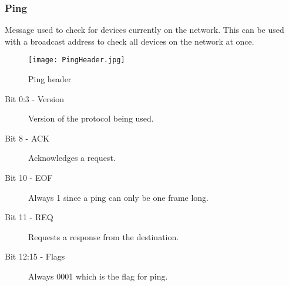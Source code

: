 \subsubsection*{Ping}
Message used to check for devices currently on the network. This can be used with a broadcast address to check all devices on the network at once.
\begin{figure}
\centering
\texttt{[image: PingHeader.jpg]}
\caption{Ping header}
\label{fig:PingHeader}
\end{figure}

\begin{description}
\item [Bit 0:3 - Version] Version of the protocol being used.
\item [Bit 8 - ACK] Acknowledges a request.
\item [Bit 10 - EOF] Always 1 since a ping can only be one frame long.
\item [Bit 11 - REQ] Requests a response from the destination.
\item [Bit 12:15 - Flags] Always 0001 which is the flag for ping.
\end{description}
